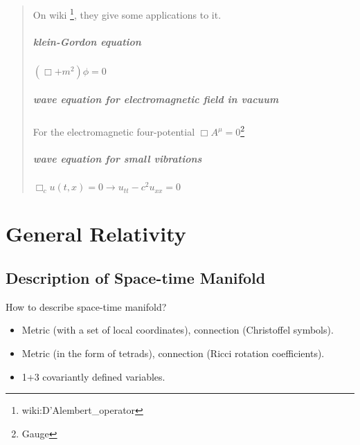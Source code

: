 \begin{quotation}
On wiki \footnote{wiki:D'Alembert\_operator}, they give some applications to it.
\paragraph{klein-Gordon equation} $(\Box+m^2)\phi=0$
\paragraph{wave equation for electromagnetic field in vacuum} For the electromagnetic four-potential $\Box A^\mu=0$\footnote{Gauge}
\paragraph{wave equation for small vibrations} $\Box_c u(t,x)=0\rightarrow u_{tt}-c^2 u_{xx}=0$
\end{quotation}














\chapter{General Relativity}






\section{Description of Space-time Manifold}


How to describe space-time manifold?
\begin{itemize}
\item
Metric (with a set of local coordinates), connection (Christoffel symbols).
\item
Metric (in the form of tetrads), connection (Ricci rotation coefficients).
\item
1+3 covariantly defined variables.
\end{itemize}



